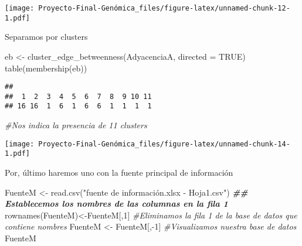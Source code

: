\documentclass[
]{article}
\newenvironment{Shaded}{\begin{snugshade}}{\end{snugshade}}
\newcommand{\AttributeTok}[1]{\textcolor[rgb]{0.77,0.63,0.00}{#1}}
\newcommand{\CommentTok}[1]{\textcolor[rgb]{0.56,0.35,0.01}{\textit{#1}}}
\newcommand{\ConstantTok}[1]{\textcolor[rgb]{0.00,0.00,0.00}{#1}}
\newcommand{\DecValTok}[1]{\textcolor[rgb]{0.00,0.00,0.81}{#1}}
\newcommand{\DocumentationTok}[1]{\textcolor[rgb]{0.56,0.35,0.01}{\textbf{\textit{#1}}}}
\newcommand{\FunctionTok}[1]{\textcolor[rgb]{0.00,0.00,0.00}{#1}}
\newcommand{\NormalTok}[1]{#1}
\newcommand{\OtherTok}[1]{\textcolor[rgb]{0.56,0.35,0.01}{#1}}
\newcommand{\SpecialCharTok}[1]{\textcolor[rgb]{0.00,0.00,0.00}{#1}}
\newcommand{\StringTok}[1]{\textcolor[rgb]{0.31,0.60,0.02}{#1}}
\begin{document}
\texttt{[image: Proyecto-Final-Genómica\_files/figure-latex/unnamed-chunk-12-1.pdf]}

Separamos por clusters

\begin{Shaded}
\begin{Highlighting}[]
\NormalTok{eb }\OtherTok{\textless{}{-}} \FunctionTok{cluster\_edge\_betweenness}\NormalTok{(AdyacenciaA, }\AttributeTok{directed =} \ConstantTok{TRUE}\NormalTok{)}
\FunctionTok{table}\NormalTok{(}\FunctionTok{membership}\NormalTok{(eb))}
\end{Highlighting}
\end{Shaded}

\begin{verbatim}
## 
##  1  2  3  4  5  6  7  8  9 10 11 
## 16 16  1  6  1  6  6  1  1  1  1
\end{verbatim}

\begin{Shaded}
\begin{Highlighting}[]
\CommentTok{\#Nos indica la presencia de 11 clusters}
\end{Highlighting}
\end{Shaded}

\texttt{[image: Proyecto-Final-Genómica\_files/figure-latex/unnamed-chunk-14-1.pdf]}

Por, último haremos uno con la fuente principal de información

\begin{Shaded}
\begin{Highlighting}[]
\NormalTok{FuenteM }\OtherTok{\textless{}{-}} \FunctionTok{read.csv}\NormalTok{(}\StringTok{"fuente de información.xlsx {-} Hoja1.csv"}\NormalTok{)}
\DocumentationTok{\#\# Establecemos los nombres de las columnas en la fila 1}
\FunctionTok{rownames}\NormalTok{(FuenteM)}\OtherTok{\textless{}{-}}\NormalTok{FuenteM[,}\DecValTok{1}\NormalTok{]}
\CommentTok{\#Eliminamos la fila 1 de la base de datos que contiene nombres}
\NormalTok{FuenteM }\OtherTok{\textless{}{-}}\NormalTok{ FuenteM[,}\SpecialCharTok{{-}}\DecValTok{1}\NormalTok{]}
\CommentTok{\#Visualizamos nuestra base de datos}
\NormalTok{FuenteM}
\end{Highlighting}
\end{Shaded}
\end{document}
